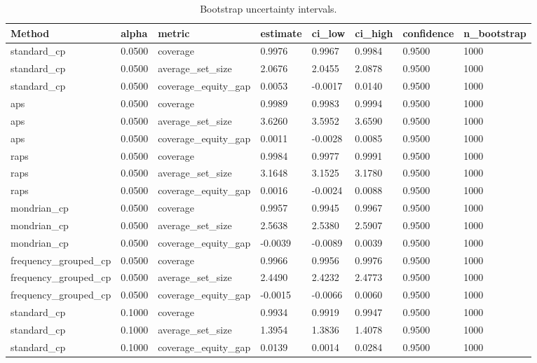 \begin{table}[htbp]
\centering
\caption{Bootstrap uncertainty intervals.}
\label{tab:bootstrap\_intervals}
\begin{tabular}{llllllll}
\hline
Method & alpha & metric & estimate & ci\_low & ci\_high & confidence & n\_bootstrap \\
\hline
standard\_cp & 0.0500 & coverage & 0.9976 & 0.9967 & 0.9984 & 0.9500 & 1000 \\
standard\_cp & 0.0500 & average\_set\_size & 2.0676 & 2.0455 & 2.0878 & 0.9500 & 1000 \\
standard\_cp & 0.0500 & coverage\_equity\_gap & 0.0053 & -0.0017 & 0.0140 & 0.9500 & 1000 \\
aps & 0.0500 & coverage & 0.9989 & 0.9983 & 0.9994 & 0.9500 & 1000 \\
aps & 0.0500 & average\_set\_size & 3.6260 & 3.5952 & 3.6590 & 0.9500 & 1000 \\
aps & 0.0500 & coverage\_equity\_gap & 0.0011 & -0.0028 & 0.0085 & 0.9500 & 1000 \\
raps & 0.0500 & coverage & 0.9984 & 0.9977 & 0.9991 & 0.9500 & 1000 \\
raps & 0.0500 & average\_set\_size & 3.1648 & 3.1525 & 3.1780 & 0.9500 & 1000 \\
raps & 0.0500 & coverage\_equity\_gap & 0.0016 & -0.0024 & 0.0088 & 0.9500 & 1000 \\
mondrian\_cp & 0.0500 & coverage & 0.9957 & 0.9945 & 0.9967 & 0.9500 & 1000 \\
mondrian\_cp & 0.0500 & average\_set\_size & 2.5638 & 2.5380 & 2.5907 & 0.9500 & 1000 \\
mondrian\_cp & 0.0500 & coverage\_equity\_gap & -0.0039 & -0.0089 & 0.0039 & 0.9500 & 1000 \\
frequency\_grouped\_cp & 0.0500 & coverage & 0.9966 & 0.9956 & 0.9976 & 0.9500 & 1000 \\
frequency\_grouped\_cp & 0.0500 & average\_set\_size & 2.4490 & 2.4232 & 2.4773 & 0.9500 & 1000 \\
frequency\_grouped\_cp & 0.0500 & coverage\_equity\_gap & -0.0015 & -0.0066 & 0.0060 & 0.9500 & 1000 \\
standard\_cp & 0.1000 & coverage & 0.9934 & 0.9919 & 0.9947 & 0.9500 & 1000 \\
standard\_cp & 0.1000 & average\_set\_size & 1.3954 & 1.3836 & 1.4078 & 0.9500 & 1000 \\
standard\_cp & 0.1000 & coverage\_equity\_gap & 0.0139 & 0.0014 & 0.0284 & 0.9500 & 1000 \\

\end{tabular}
\end{table}
